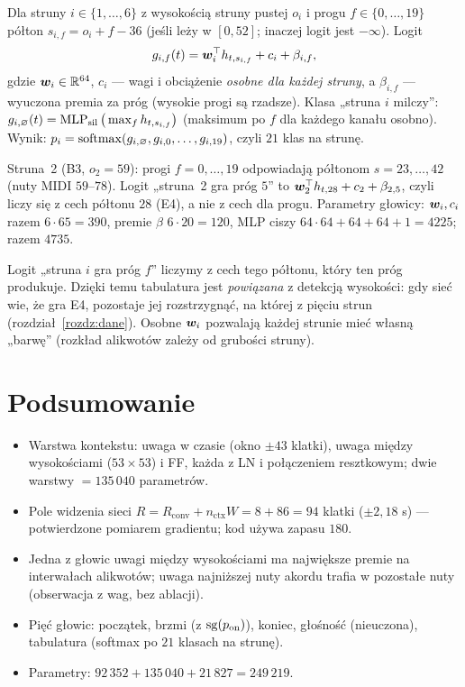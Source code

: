 \begin{definicja}\label{def:tab}
Dla struny $i\in\{1,\dots,6\}$ z wysokością struny pustej $o_i$ i progu $f\in\{0,\dots,19\}$ półton $s_{i,f}=o_i+f-36$ (jeśli leży w $[0,52]$; inaczej logit jest $-\infty$). Logit
\begin{equation}
  g_{i,f}(t)=\bm{w}_i^{\top}h_{t,s_{i,f}}+c_i+\beta_{i,f},
\end{equation}
gdzie $\bm{w}_i\in\mathbb{R}^{64}$, $c_i$ --- wagi i obciążenie \emph{osobne dla każdej struny}, a $\beta_{i,f}$ --- wyuczona premia za próg (wysokie progi są rzadsze). Klasa „struna $i$ milczy”: $g_{i,\varnothing}(t)=\operatorname{MLP}_\mathrm{sil}\big(\max_f h_{t,s_{i,f}}\big)$ (maksimum po $f$ dla każdego kanału osobno).
Wynik: $p_i=\operatorname{softmax}(g_{i,\varnothing},g_{i,0},\dots,g_{i,19})$, czyli $21$ klas na strunę.
\end{definicja}

\begin{przyklad}\label{prz:tab-b3}
Struna~2 (B3, $o_2=59$): progi $f=0,\dots,19$ odpowiadają półtonom $s=23,\dots,42$ (nuty MIDI $59$--$78$). Logit „struna~2 gra próg $5$” to $\bm{w}_2^{\top}h_{t,28}+c_2+\beta_{2,5}$, czyli liczy się z cech półtonu $28$ (E4), a nie z cech dla progu. Parametry głowicy: $\bm{w}_i,c_i$ razem $6\cdot65=390$, premie $\beta$ $6\cdot20=120$, MLP ciszy $64\cdot64+64+64+1=4225$; razem $4735$.
\end{przyklad}

\begin{intuicja}
Logit „struna $i$ gra próg $f$” liczymy z cech tego półtonu, który ten próg produkuje. Dzięki temu tabulatura jest \emph{powiązana} z detekcją wysokości: gdy sieć wie, że gra E4, pozostaje jej rozstrzygnąć, na której z pięciu strun (rozdział~\ref{rozdz:dane}).
Osobne $\bm{w}_i$ pozwalają każdej strunie mieć własną „barwę” (rozkład alikwotów zależy od grubości struny).
\end{intuicja}

\section*{Podsumowanie}
\begin{itemize}
\item Warstwa kontekstu: uwaga w czasie (okno $\pm43$ klatki), uwaga między wysokościami ($53\times53$) i FF, każda z LN i połączeniem resztkowym; dwie warstwy $=135\,040$ parametrów.
\item Pole widzenia sieci $R=R_\mathrm{conv}+n_\mathrm{ctx}W=8+86=94$ klatki ($\pm2{,}18$ s) --- potwierdzone pomiarem gradientu; kod używa zapasu $180$.
\item Jedna z głowic uwagi między wysokościami ma największe premie na interwałach alikwotów; uwaga najniższej nuty akordu trafia w pozostałe nuty (obserwacja z wag, bez ablacji).
\item Pięć głowic: początek, brzmi (z $\operatorname{sg}(p_\mathrm{on})$), koniec, głośność (nieuczona), tabulatura (softmax po $21$ klasach na strunę).
\item Parametry: $92\,352+135\,040+21\,827=249\,219$.
\end{itemize}

